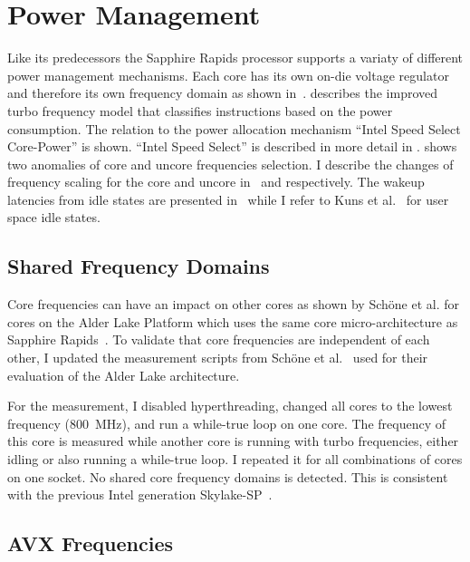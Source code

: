 \chapter{Power Management}
\label{sec:power_management}

Like its predecessors the Sapphire Rapids processor supports a variaty of different power management mechanisms.
Each core has its own on-die voltage regulator and therefore its own frequency domain as shown in~.
 describes the improved turbo frequency model that classifies instructions based on the power consumption.
The relation to the power allocation mechanism ``Intel Speed Select Core-Power'' is shown.
``Intel Speed Select'' is described in more detail in .
 shows two anomalies of core and uncore frequencies selection.
I describe the changes of frequency scaling for the core and uncore in~ and  respectively.
The wakeup latencies from idle states are presented in~ while I refer to Kuns et al.~\cite{Kuns_2025_UserSpaceIdle} for user space idle states.

\section{Shared Frequency Domains}
\label{sec:shared_freq_domains}
Core frequencies can have an impact on other cores as shown by Schöne et al. for cores on the Alder Lake Platform which uses the same core micro-architecture as Sapphire Rapids~\cite{Schoene_2024_Alder_Lake}.
To validate that core frequencies are independent of each other, I updated the measurement scripts from Sch\"one et al.~\cite{Schoene_2024_Alder_Lake} used for their evaluation of the Alder Lake architecture.

For the measurement, I disabled hyperthreading, changed all cores to the lowest frequency (\SI{800}{\MHz}), and run a while-true loop on one core.
The frequency of this core is measured while another core is running with turbo frequencies, either idling or also running a while-true loop.
I repeated it for all combinations of cores on one socket.
No shared core frequency domains is detected.
This is consistent with the previous Intel generation Skylake-SP~\cite[Sec. 2.6.3]{Intel_Optimization_Reference_Manual_050}.

\section{AVX Frequencies}
\label{sec:avx-frequencies}

